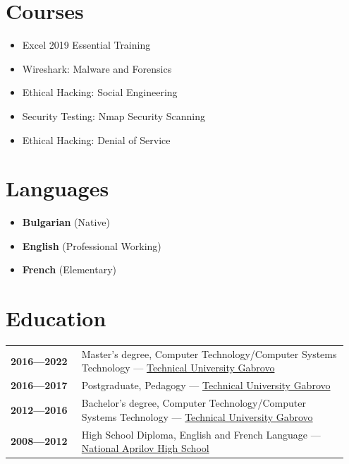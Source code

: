 \documentclass[letterpaper,10pt]{article}
\begin{document}
\begin{center}
	\begin{minipage}[t]{0.5\textwidth}
		\section*{Courses}
		\begin{itemize}
			\item Excel 2019 Essential Training
			\item Wireshark: Malware and Forensics
			\item Ethical Hacking: Social Engineering
			\item Security Testing: Nmap Security Scanning
			\item Ethical Hacking: Denial of Service
		\end{itemize}
	\end{minipage}%
	\begin{minipage}[t]{0.5\textwidth}
		\section*{Languages}
		\begin{itemize}
			\item \textbf{Bulgarian} (Native)
			\item \textbf{English} (Professional Working)
			\item \textbf{French} (Elementary)
		\end{itemize}
		\newpage
		\section*{Education}
		\begin{tabular}{@{}p{0.2\linewidth} p{0.75\linewidth}}
			\textbf{2016—2022} & Master's degree, Computer Technology/Computer Systems Technology — \href{https://www.tugab.bg/en/}{Technical University Gabrovo} \\
			\textbf{2016—2017} & Postgraduate, Pedagogy — \href{https://www.tugab.bg/en/}{Technical University Gabrovo} \\
			\textbf{2012—2016} & Bachelor's degree, Computer Technology/Computer Systems Technology — \href{https://www.tugab.bg/en/}{Technical University Gabrovo} \\
			\textbf{2008—2012} & High School Diploma, English and French Language — \href{https://nag-school.org/}{National Aprilov High School} \\
		\end{tabular}
	\end{minipage}
\end{center}
			
\end{document}
